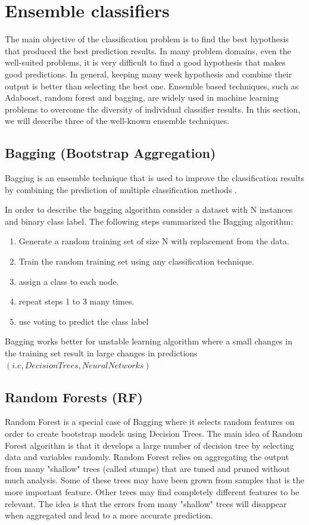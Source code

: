 \documentclass[runningheads,a4paper]{llncs}
\begin{document}
\section{Ensemble classifiers}
\label{ensembles}

The main objective of the classification problem is to find the best hypothesis that produced the best prediction results. In many problem domains, even the well-suited problems, it is very difficult to find a good hypothesis that makes good predictions. In general, keeping many week hypothesis and combine their output is better than selecting the best one.
Ensemble based techniques, such as Adaboost, random forest and bagging, are widely used in machine learning problems to overcome the diversity of individual classifier results. In this section, we will describe three of the well-known ensemble techniques.
\subsection{Bagging (Bootstrap Aggregation)}
Bagging is an ensemble technique that is used to improve the classification results by combining the prediction of multiple classification methods \cite{Breiman1996}.

In order to describe the bagging algorithm consider a dataset with N instances and binary class label. The following steps summarized the Bagging algorithm:

\begin{enumerate}
\item Generate a random training set of size N with replacement from the data.
\item Train the random training set using any classification technique.
\item assign a class to each node.
\item repeat steps 1 to 3  many times.
\item use voting to predict the class label

\end{enumerate}

Bagging works better for unstable  learning algorithm where a small changes in the training set result in large changes in predictions $(i.e, Decision Trees,  Neural Networks)$

\subsection{Random Forests (RF)}
Random Forest \cite{breiman2001random} is a special case of Bagging where it selects  random features on order to create bootstrap models using Decision Trees. The main idea of Random Forest algorithm is that it develops a large number of decision tree by selecting data and variables randomly.
Random Forest relies on aggregating the output from many "shallow" trees (called stumps) that are tuned and pruned without much analysis. Some of these trees may have been grown from samples that is the more important feature. Other trees may find completely different features to be relevant.  The idea is that the errors from many "shallow" trees will disappear when aggregated and lead to a more accurate prediction. 
\end{document}
